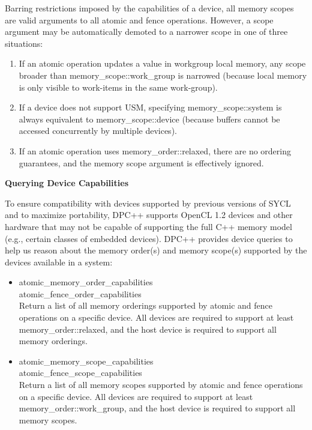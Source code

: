 Barring restrictions imposed by the capabilities of a device, all memory scopes are valid arguments to all atomic and fence operations. However, a scope argument may be automatically demoted to a narrower scope in one of three situations:\par

\begin{enumerate}
	\item If an atomic operation updates a value in workgroup local memory, any scope broader than 	memory\_scope::work\_group is narrowed (because local memory is only visible to work-items in the same work-group).
	\item If a device does not support USM, specifying memory\_scope::system is always equivalent to memory\_scope::device (because buffers cannot be accessed concurrently by multiple devices).
	\item If an atomic operation uses memory\_order::relaxed, there are no ordering guarantees, and the memory scope argument is effectively ignored.
\end{enumerate}

\hspace*{\fill} \par %
\textbf{Querying Device Capabilities}

To ensure compatibility with devices supported by previous versions of SYCL and to maximize portability, DPC++ supports OpenCL 1.2 devices and other hardware that may not be capable of supporting the full C++ memory model (e.g., certain classes of embedded devices). DPC++ provides device queries to help us reason about the memory order(s) and memory scope(s) supported by the devices available in a system:\par

\begin{itemize}
	\item atomic\_memory\_order\_capabilities \\
	atomic\_fence\_order\_capabilities \\
	Return a list of all memory orderings supported by atomic and fence operations on a specific device. All devices are required to support at least memory\_order::relaxed, and the host device is required to support all memory orderings.
	\item atomic\_memory\_scope\_capabilities \\
	atomic\_fence\_scope\_capabilities \\
	Return a list of all memory scopes supported by atomic and fence operations on a specific device. All devices are required to support at least memory\_order::work\_group, and the host device is required to support all memory scopes.
\end{itemize}

